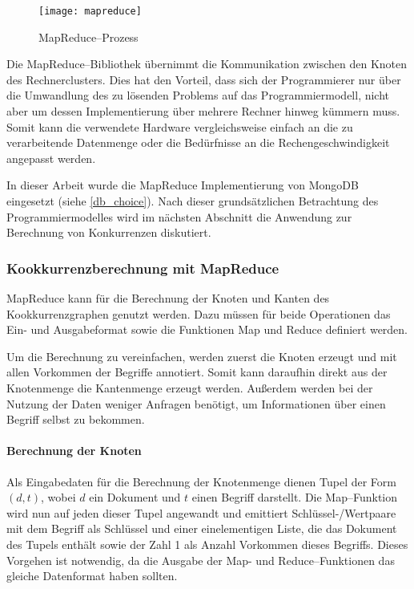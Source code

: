 \begin{figure}
\centering
\texttt{[image: mapreduce]}
\caption{MapReduce--Prozess}
\label{fig:mapreduce}
\end{figure}

Die MapReduce--Bibliothek übernimmt die Kommunikation zwischen den Knoten des Rechnerclusters. Dies hat den Vorteil, dass sich der Programmierer nur über die Umwandlung des zu lösenden Problems auf das Programmiermodell, nicht aber um dessen Implementierung über mehrere Rechner hinweg kümmern muss. Somit kann die verwendete Hardware vergleichsweise einfach an die zu verarbeitende Datenmenge oder die Bedürfnisse an die Rechengeschwindigkeit angepasst werden.

In dieser Arbeit wurde die MapReduce Implementierung von MongoDB eingesetzt (siehe \cref{db_choice}). Nach dieser grundsätzlichen Betrachtung des Programmiermodelles wird im nächsten Abschnitt die Anwendung zur Berechnung von Konkurrenzen diskutiert.


\subsubsection{Kookkurrenzberechnung mit MapReduce}
\label{mapreduce_cooccurence}

MapReduce kann für die Berechnung der Knoten und Kanten des Kookkurrenzgraphen genutzt werden. Dazu müssen für beide Operationen das Ein- und Ausgabeformat sowie die Funktionen Map und Reduce definiert werden.

Um die Berechnung zu vereinfachen, werden zuerst die Knoten erzeugt und mit allen Vorkommen der Begriffe annotiert. Somit kann daraufhin direkt aus der Knotenmenge die Kantenmenge erzeugt werden. Außerdem werden bei der Nutzung der Daten weniger Anfragen benötigt, um Informationen über einen Begriff selbst zu bekommen.

\paragraph{Berechnung der Knoten}

Als Eingabedaten für die Berechnung der Knotenmenge dienen Tupel der Form \((d, t)\), wobei \(d\) ein Dokument und \(t\) einen Begriff darstellt. Die Map--Funktion wird nun auf jeden dieser Tupel angewandt und emittiert Schlüssel-/Wertpaare mit dem Begriff als Schlüssel und einer einelementigen Liste, die das Dokument des Tupels enthält sowie der Zahl \num{1} als Anzahl Vorkommen dieses Begriffs. Dieses Vorgehen ist notwendig, da die Ausgabe der Map- und Reduce--Funktionen das gleiche Datenformat haben sollten.


